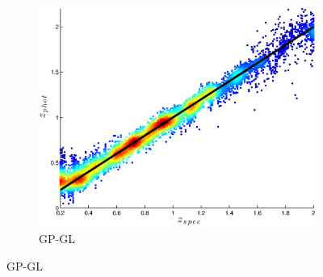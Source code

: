 \documentclass[useAMS,usenatbib,fleqn]{mn2e}
\begin{document}
\begin{figure}
\begin{subfigure}[b]{0.3\textwidth}
                \includegraphics[width=\textwidth]{figures/GPGL.eps}
                \caption{GP-GL}
        \end{subfigure}
        

\end{figure}
\end{document}
